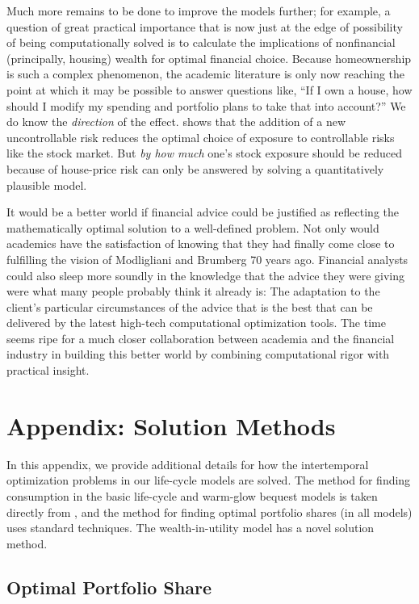 \documentclass{article}
\begin{document}
Much more remains to be done to improve the models further; for example, a question of great practical importance that is now just at the edge of possibility of being computationally solved is to calculate the implications of nonfinancial (principally, housing) wealth for optimal financial choice.
Because homeownership is such a complex phenomenon, the academic literature is only now reaching the point at which it may be possible to answer questions like, ``If I own a house, how should I modify my spending and portfolio plans to take that into account?''
We do know the \textit{direction} of the effect.
\cite{kimballStandardRA} shows that the addition of a new uncontrollable risk reduces the optimal choice of exposure to controllable risks like the stock market.
But \textit{by how much} one's stock exposure should be reduced because of house-price risk can only be answered by solving a quantitatively plausible model.

It would be a better world if financial advice could be justified as reflecting the mathematically optimal solution to a well-defined problem.
Not only would academics have the satisfaction of knowing that they had finally come close to fulfilling the vision of Modligliani and Brumberg 70 years ago.
Financial analysts could also sleep more soundly in the knowledge that the advice they were giving were what many people probably think it already is: The adaptation to the client's particular circumstances of the advice that is the best that can be delivered by the latest high-tech computational optimization tools.
The time seems ripe for a much closer collaboration between academia and the financial industry in building this better world by combining computational rigor with practical insight.


\appendix
\section{Appendix: Solution Methods}

In this appendix, we provide additional details for how the intertemporal optimization problems in our life-cycle models are solved. The method for finding consumption in the basic life-cycle and warm-glow bequest models is taken directly from \cite{CarrollEGM}, and the method for finding optimal portfolio shares (in all models) uses standard techniques. The wealth-in-utility model has a novel solution method.

\subsection{Optimal Portfolio Share}
\end{document}
